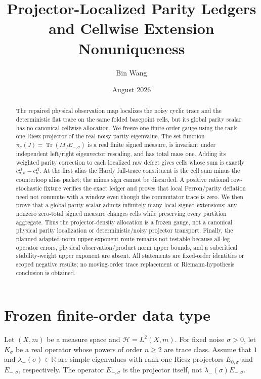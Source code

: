 \documentclass[11pt]{article}
\title{Projector-Localized Parity Ledgers\\
and Cellwise Extension Nonuniqueness}
\author{Bin Wang}
\date{August 2026}
\theoremstyle{remark}
\newcommand{\Tr}{\operatorname{Tr}}
\newcommand{\cH}{\mathcal H}
\begin{document}
\maketitle

\begin{abstract}
The repaired physical observation map localizes the noisy cyclic trace and
the deterministic flat trace on the same folded basepoint cells, but its
global parity scalar has no canonical cellwise allocation.  We freeze one
finite-order gauge using the rank-one Riesz projector of the real noisy
parity eigenvalue.  The set function
$\pi_\sigma(J)=\Tr(M_JE_{-,\sigma})$ is a real finite signed measure,
is invariant under independent left/right eigenvector rescaling, and has
total mass one.  Adding its weighted parity correction to each localized
raw defect gives cells whose sum is exactly
$c^H_{\sigma,n}-c^H_n$.  At the first alias the Hardy full-trace constituent
is the cell sum minus the counterloop alias packet; the minus sign cannot be
discarded.  A positive rational row-stochastic fixture verifies the exact
ledger and proves that local Perron/parity deflation need not commute with a
window even though the commutator trace is zero.  We then prove that a global
parity scalar admits infinitely many local signed extensions: any nonzero
zero-total signed measure changes cells while preserving every partition
aggregate.  Thus the projector-density allocation is a frozen gauge, not a
canonical physical parity localization or deterministic/noisy projector
transport.  Finally, the planned adapted-norm upper-exponent route remains
not testable because all-leg operator errors, physical observation/product
norm upper bounds, and a subcritical stability-weight upper exponent are
absent.  All statements are fixed-order identities or scoped negative
results; no moving-order trace replacement or Riemann-hypothesis conclusion
is obtained.
\end{abstract}

\section{Frozen finite-order data type}

Let $(X,m)$ be a measure space and $\cH=L^2(X,m)$.  For fixed noise
$\sigma>0$, let $K_\sigma$ be a real operator whose powers of order
$n\ge2$ are trace class.  Assume that $1$ and
$\lambda_-(\sigma)\in\mathbb R$ are simple eigenvalues with rank-one Riesz
projectors $E_{0,\sigma}$ and $E_{-,\sigma}$, respectively.  The operator
$E_{-,\sigma}$ is the projector itself, not
$\lambda_-(\sigma)E_{-,\sigma}$.
\end{document}
